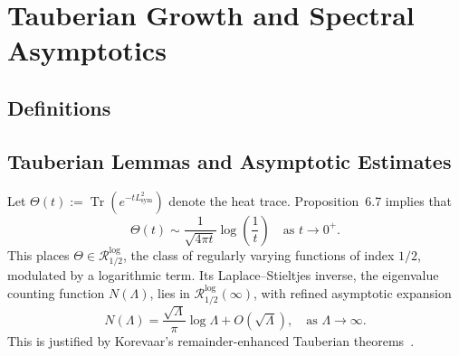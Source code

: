 \section{Tauberian Growth and Spectral Asymptotics}
\label{sec:tauberian_growth}



\subsection{Definitions}




\subsection{Tauberian Lemmas and Asymptotic Estimates}













\begin{remark}
Let \( \Theta(t) := \operatorname{Tr}(e^{-tL^2_{\mathrm{sym}}}) \) denote the heat trace. Proposition~6.7 implies that
\[
\Theta(t) \sim \frac{1}{\sqrt{4\pi t}}\log\left(\frac{1}{t}\right)
\quad \text{as } t \to 0^+.
\]
This places \( \Theta \in \mathcal{R}_{1/2}^{\log} \), the class of regularly varying functions of index \( 1/2 \), modulated by a logarithmic term. Its Laplace–Stieltjes inverse, the eigenvalue counting function \( N(\Lambda) \), lies in \( \mathcal{R}_{1/2}^{\log}(\infty) \), with refined asymptotic expansion
\[
N(\Lambda) = \frac{\sqrt{\Lambda}}{\pi}\log \Lambda + O(\sqrt{\Lambda}),
\quad \text{as } \Lambda \to \infty.
\]
This is justified by Korevaar's remainder-enhanced Tauberian theorems~\cite[Ch.~III, §5]{Korevaar2004Tauberian}.
\end{remark}

